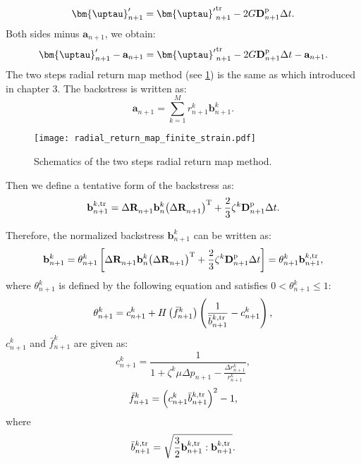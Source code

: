 \begin{equation}
{\bm{\uptau }}'_{n + 1} = {{\bm{\uptau }}'}_{n + 1}^{\rm tr} - 2G{\mathbf{D}}_{n + 1}^{\rm p} \Delta t.
\end{equation}
Both sides minus ${{\mathbf{a}}_{n + 1}}$, we obtain:
\begin{equation}
\label{Equ_5:sminusa1}
{\bm{\uptau }}'_{n + 1} - {{\mathbf{a}}_{n + 1}} = {{\bm{\uptau }}'}_{n + 1}^{\rm tr} - 2G{\mathbf{D}}_{n + 1}^{\rm p} \Delta t - {{\mathbf{a}}_{n + 1}}.
\end{equation}
The two steps radial return map method (see \ref{Fig:radial_return_map_finite_strain}) is the same as which introduced in chapter 3. The backstress is written as:
\begin{equation}
{{\mathbf{a}}_{n + 1}} = \sum\limits_{k = 1}^M {r_{n + 1}^k{\mathbf{b}}_{n + 1}^k}.
\end{equation}

\begin{figure}[!htp]
	\centering
	\texttt{[image: radial\_return\_map\_finite\_strain.pdf]}
	\caption{Schematics of the two steps radial return map method.}
	\label{Fig:radial_return_map_finite_strain}
\end{figure}

Then we define a tentative form of the backstress as:
\begin{equation}
\label{Equ_5:btrn+1}
{\mathbf{b}}_{n + 1}^{k,\rm tr} = \Delta {\mathbf{R}}_{n + 1}^{}{{\mathbf{b}}_n^k}{\left( {\Delta {\mathbf{R}}_{n + 1}^{}} \right)^{\rm{T}}}  + \frac{2}{3}{\zeta ^k}{\mathbf{D }}_{n + 1}^{\rm p} \Delta t.
\end{equation}

Therefore, the normalized backstress ${\mathbf{b}}_{n + 1}^k$ can be written as:
\begin{equation}
\label{Equ_5:bn+1}
{\mathbf{b}}_{n + 1}^k = \theta _{n + 1}^k\left[ \Delta {\mathbf{R}}_{n + 1}^{}{{\mathbf{b}}_n^k}{\left( {\Delta {\mathbf{R}}_{n + 1}^{}} \right)^{\rm{T}}}  + \frac{2}{3}{\zeta ^k}{\mathbf{D }}_{n + 1}^{\rm p} \Delta t \right] = \theta _{n + 1}^k{\mathbf{b}}_{n + 1}^{k,\rm tr},
\end{equation}
where $\theta _{n + 1}^k$ is defined by the following equation and satisfies $0 < \theta _{n + 1}^k \leqslant 1$:
\begin{equation}
\label{Equ_5:thetan+1}
\theta _{n + 1}^k = c_{n + 1}^k + H\left( {\bar f_{n + 1}^k} \right)\left( {\frac{1}{{\bar b_{n + 1}^{k,\rm tr}}} - c_{n + 1}^k} \right),
\end{equation}
$c_{n + 1}^k$ and ${\bar f_{n + 1}^k}$ are given as:
\begin{equation}
c_{n + 1}^k = \frac{1}{{1 + {\zeta ^k}\mu \Delta {p_{n + 1}} - \frac{{\Delta r_{n + 1}^k}}{{r_{n + 1}^k}}}},
\end{equation}
\begin{equation}
\bar f_{n + 1}^k = {\left( {c_{n + 1}^k\bar b_{n + 1}^{k,\rm tr}} \right)^2} - 1,
\end{equation}
where
\begin{equation}
\bar b_{n + 1}^{k,\rm tr} = \sqrt {\frac{3}{2}{\mathbf{b}}_{n + 1}^{k,\rm tr}:{\mathbf{b}}_{n + 1}^{k,\rm tr}}.
\end{equation}

